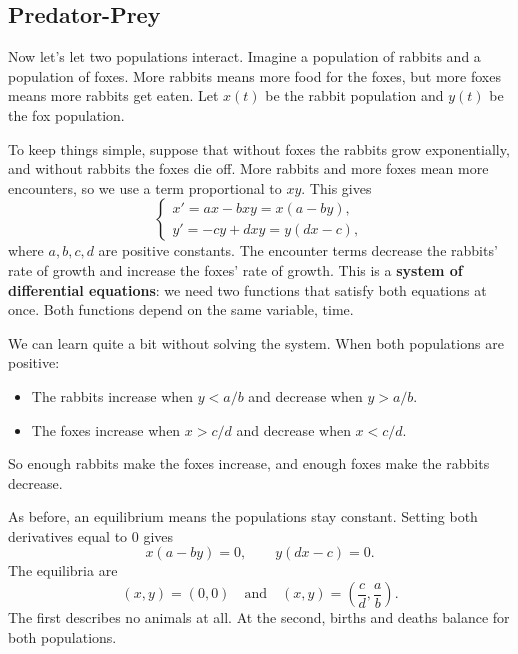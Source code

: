 \subsection{Predator-Prey}

Now let's let two populations interact. Imagine a population of rabbits
and a population of foxes. More rabbits means more food for the foxes,
but more foxes means more rabbits get eaten. Let $x(t)$ be the rabbit
population and $y(t)$ be the fox population.

To keep things simple, suppose that without foxes the rabbits grow
exponentially, and without rabbits the foxes die off. More rabbits and
more foxes mean more encounters, so we use a term proportional to $xy$.
This gives
$$
\begin{cases}
x'=ax-bxy=x(a-by),\\
y'=-cy+dxy=y(dx-c),
\end{cases}
$$
where $a,b,c,d$ are positive constants. The encounter terms decrease
the rabbits' rate of growth and increase the foxes' rate of growth.
This is a \textbf{system of differential equations}: we need two functions
that satisfy both equations at once. Both functions depend on the same
variable, time.

We can learn quite a bit without solving the system. When both
populations are positive:
\begin{itemize}
\item The rabbits increase when $y<a/b$ and decrease when $y>a/b$.
\item The foxes increase when $x>c/d$ and decrease when $x<c/d$.
\end{itemize}
So enough rabbits make the foxes increase, and enough foxes make the
rabbits decrease.

As before, an equilibrium means the populations stay constant. Setting
both derivatives equal to 0 gives
$$x(a-by)=0,\qquad y(dx-c)=0.$$
The equilibria are
$$ (x,y)=(0,0)\quad\text{and}\quad(x,y)=\left(\frac cd,\frac ab\right).$$
The first describes no animals at all. At the second, births and deaths
balance for both populations.

